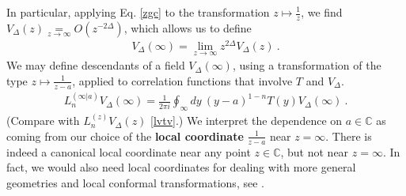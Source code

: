 \documentclass[12pt, a4paper]{article}
\newcommand{\myindex}[1]{\textbf{\boldmath #1}}
\theoremstyle{break}
\begin{document}
In particular, applying Eq. \eqref{zgc} to the transformation $z\mapsto \frac{1}{z}$, we find $V_\Delta(z)\underset{z\to\infty}{=} O(z^{-2\Delta})$, which allows us to define 
\begin{align}
 V_\Delta(\infty) = \lim_{z\to\infty} z^{2\Delta}V_\Delta(z)\ . 
 \label{vdi}
\end{align}
We may define descendants of a field $V_\Delta(\infty)$, using a transformation of the type $z\mapsto \frac{1}{z-a}$, applied to correlation functions that involve $T$ and $V_\Delta$. 
\begin{align}
 L_n^{(\infty|a)} V_\Delta(\infty) = \frac{1}{2\pi i} \oint_\infty dy\ (y-a)^{1-n} T(y)V_\Delta(\infty)\ .
 \label{lnia}
\end{align}
(Compare with $L_n^{(z)}V_\Delta(z)$ \eqref{lvtv}.) 
We interpret the dependence on $a\in\mathbb{C}$ as coming from our choice of the \myindex{local coordinate} $\frac{1}{z-a}$ near $z=\infty$. There is indeed a canonical local coordinate near any point $z\in\mathbb{C}$, but not near $z=\infty$. In fact, we would also need local coordinates for dealing with more general geometries and local conformal transformations, see \cite[Section 6.2]{br21}. 
\end{document}
